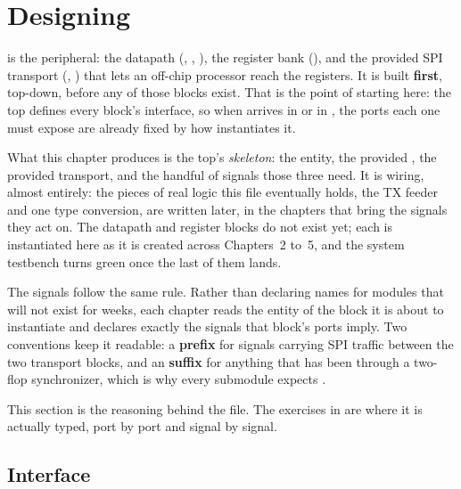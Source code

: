 
\section{Designing }
\label{c1:sec:uart_top}\label{c1:app:b}
 is the peripheral: the datapath (, , ),
the register bank (), and the provided SPI transport (,
) that lets an off-chip processor reach the registers. It is built
\textbf{first}, top-down, before any of those blocks exist. That is the point of starting here: the
top defines every block's interface, so when  arrives in  or
 in , the ports each one must expose are already fixed by how
 instantiates it.

What this chapter produces is the top's \emph{skeleton}: the entity, the provided
, the provided transport, and the handful of signals those three need. It is
wiring, almost entirely: the pieces of real logic this file eventually holds, the TX feeder and one
type conversion, are written later, in the chapters that bring the signals they act on. The
datapath and register blocks do not exist yet; each is instantiated here as it is created across
Chapters~2 to~5, and the system testbench turns green once the last of them lands.

The signals follow the same rule. Rather than declaring names for modules that will not exist for
weeks, each chapter reads the entity of the block it is about to instantiate and declares exactly
the signals that block's ports imply. Two conventions keep it readable: a \textbf{
prefix} for signals carrying SPI traffic between the two transport blocks, and an \textbf{
suffix} for anything that has been through a two-flop synchronizer, which is why every submodule
expects .

This section is the reasoning behind the file. The exercises in  are where
it is actually typed, port by port and signal by signal.

\subsection{Interface}
\label{c1:sec:uart_top_interface}

